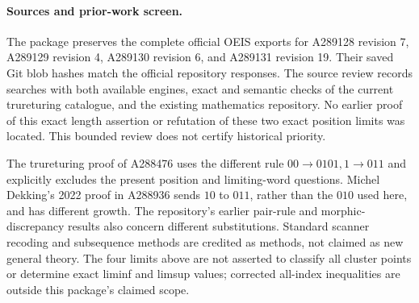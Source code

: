 \paragraph{Sources and prior-work screen.}
The package preserves the complete official OEIS exports for
A289128 revision 7, A289129 revision 4, A289130 revision 6, and
A289131 revision 19. Their saved Git blob hashes match the
official repository responses. The source review records searches
with both available engines, exact and semantic checks of the
current trureturing catalogue, and the existing mathematics
repository. No earlier proof of this exact length assertion or
refutation of these two exact position limits was located. This
bounded review does not certify historical priority.

The trureturing proof of A288476 uses the different rule
$00\to0101,1\to011$ and explicitly excludes the present position
and limiting-word questions. Michel Dekking's 2022 proof in
A288936 sends $10$ to $011$, rather than the $010$ used here, and
has different growth. The repository's earlier pair-rule and
morphic-discrepancy results also concern different substitutions.
Standard scanner recoding and subsequence methods are credited as
methods, not claimed as new general theory. The four limits above
are not asserted to classify all cluster points or determine exact
liminf and limsup values; corrected all-index inequalities are
outside this package's claimed scope.
